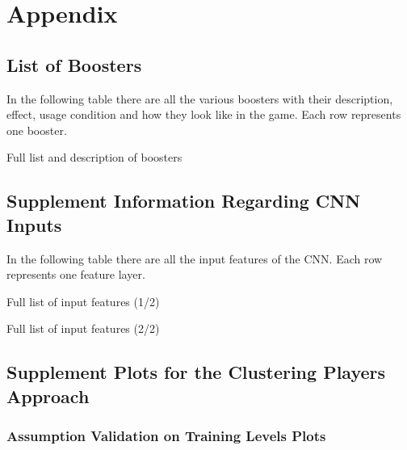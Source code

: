 \chapter{Appendix}

\section{List of Boosters}\label{boosters}

In the following table there are all the various boosters with their description, effect, usage condition and how they look like in the game. Each row represents one booster.

\begin{table}[H]
    \caption{Full list and description of boosters}
    \centering
    \tiny
    
    \label{tab:boosters}
\end{table}
    
\section{Supplement Information Regarding CNN Inputs}

In the following table there are all the input features of the \ac{CNN}. Each row represents one feature layer.

\FloatBarrier

\begin{table}[H]
    \caption{Full list of input features (1/2)}
    \centering
    \tiny
    
    \label{tab:features_1}
\end{table}

\begin{table}[H]
    \caption{Full list of input features (2/2)}
    \centering
    \tiny
    
    \label{tab:features_2}
\end{table}






\section{Supplement Plots for the Clustering Players Approach}





\subsection{Assumption Validation on Training Levels Plots}\label{assamp_val}

